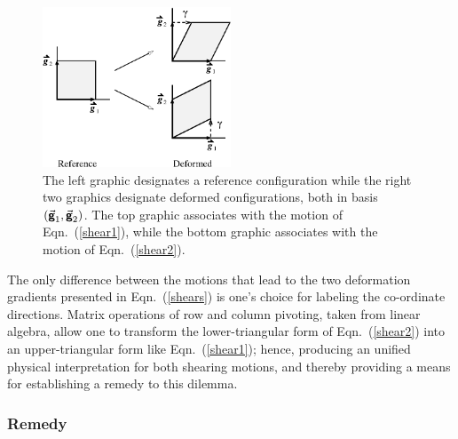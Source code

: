 \begin{figure}
	\centering
	\includegraphics[width=0.5\textwidth]{figures/figDilemma.png}
	\caption{The left graphic designates a reference configuration while the right two graphics designate deformed configurations, both in basis $( \vec{\boldsymbol{\mathsf{g}}}_1 , \vec{\boldsymbol{\mathsf{g}}}_2 )$.  The top graphic associates with the motion of Eqn.~(\ref{shear1}), while the bottom graphic associates with the motion of Eqn.~(\ref{shear2}).}
	\label{figDilemma}
\end{figure}

The only difference between the motions that lead to the two deformation gradients presented in Eqn.~(\ref{shears}) is one's choice for labeling the co-ordinate directions.  Matrix operations of row and column pivoting, taken from linear algebra, allow one to transform the lower-triangular form of Eqn.~(\ref{shear2}) into an upper-triangular form like Eqn.~(\ref{shear1}); hence, producing an unified physical interpretation for both shearing motions, and thereby providing a means for establishing a remedy to this dilemma. 


\subsubsection{Remedy}
\label{secRemedy}

